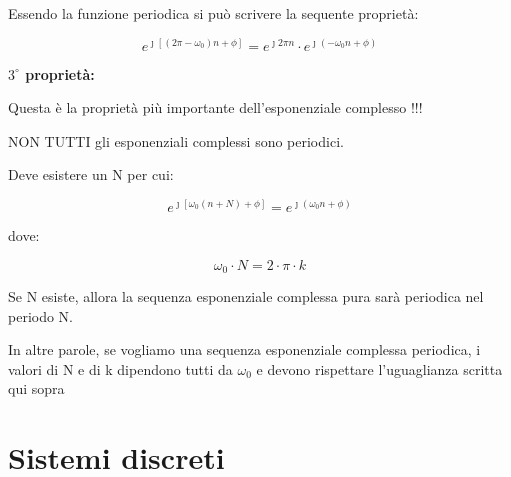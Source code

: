 Essendo la funzione periodica si può scrivere la sequente proprietà: 

{
    \Large 
    \begin{equation}
        e^{\jmath \left[ \left( 2 \pi - \omega_0\right) n + \phi\right]}
        = 
        e^{\jmath 2 \pi n} \cdot e^{\jmath \left( - \omega_0 n + \phi\right)}
    \end{equation}
}

\textbf{$3^{\circ}$ proprietà: } \newline 

\begin{tcolorbox}
    Questa è la proprietà più importante dell'esponenziale complesso !!!
\end{tcolorbox}

NON TUTTI gli esponenziali complessi sono periodici. \newline 

Deve esistere un N per cui: 

{
    \Large 
    \begin{equation}
        e^{\jmath \left[ \omega_0 \left( n + N\right) + \phi\right]}
        = 
        e^{\jmath \left(\omega_0 n + \phi\right)}
    \end{equation}
}

dove: 

{
    \Large 
    \begin{equation}
        \omega_0 \cdot N
        = 
        2 \cdot \pi \cdot k
    \end{equation}
}

Se N esiste, allora la sequenza esponenziale complessa pura sarà periodica nel periodo N. \newline 

\begin{tcolorbox}
    In altre parole, se vogliamo una sequenza esponenziale complessa periodica,  
    i valori di N e di k dipendono tutti da $\omega_0$ e devono rispettare l'uguaglianza scritta qui sopra
\end{tcolorbox}

\newpage 

\section{Sistemi discreti}


